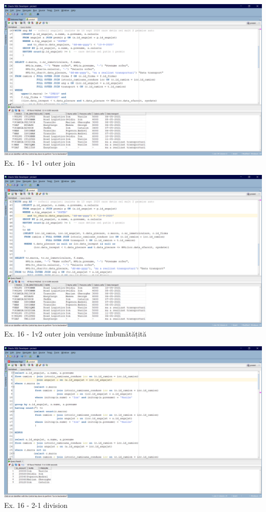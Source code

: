 \documentclass[12pt, a4paper]{article}
\begin{document}
\includegraphics[width=\textwidth]{outer_join_1.PNG}
\label{Ex16 1-1}
\centering Ex. 16 - 1v1 outer join

\includegraphics[width=\textwidth]{outer_join_2.PNG}
\label{Ex16 1-2}
\centering Ex. 16 - 1v2 outer join versiune îmbunătățită

\includegraphics[width=\textwidth]{division_1.PNG}
\label{Ex16 2-1}
\centering Ex. 16 - 2-1 division
\end{document}
